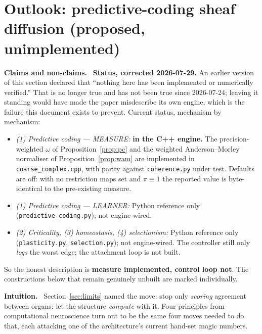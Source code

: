 \documentclass[11pt]{article}
\theoremstyle{definition}
\theoremstyle{plain}
\theoremstyle{remark}
\newcommand{\Intu}{\noindent\textbf{\color{intuitioncol}Intuition.}\ }
\newcommand{\Hon}{\noindent\textbf{\color{honestycol}Claims and non-claims.}\ }
\begin{document}
\section{Outlook: predictive-coding sheaf diffusion (proposed, unimplemented)}\label{sec:outlook}

\begin{hon}\Hon
\textbf{Status, corrected 2026-07-29.} An earlier version of this section declared
that ``nothing here has been implemented or numerically verified.'' That is no longer
true and has not been true since 2026-07-24; leaving it standing would have made the
paper misdescribe its own engine, which is the failure this document exists to
prevent. Current status, mechanism by mechanism:
\begin{itemize}[nosep]
\item \emph{(1) Predictive coding --- MEASURE:} \textbf{in the C++ engine.} The
  precision-weighted $\omega$ of Proposition~\ref{prop:pc} and the weighted
  Anderson--Morley normaliser of Proposition~\ref{prop:wam} are implemented in
  \texttt{coarse\_complex.cpp}, with parity against \texttt{coherence.py} under test.
  Defaults are off: with no restriction maps set and $\pi\equiv1$ the reported value
  is byte-identical to the pre-existing measure.
\item \emph{(1) Predictive coding --- LEARNER:} Python reference only
  (\texttt{predictive\_coding.py}); not engine-wired.
\item \emph{(2) Criticality, (3) homeostasis, (4) selectionism:} Python reference only
  (\texttt{plasticity.py}, \texttt{selection.py}); not engine-wired. The controller
  still only \emph{logs} the worst edge; the attachment loop is not built.
\end{itemize}
So the honest description is \textbf{measure implemented, control loop not}. The
constructions below that remain genuinely unbuilt are marked individually.
\end{hon}

\begin{intu}\Intu
Section~\ref{sec:limits} named the move: stop only \emph{scoring} agreement between
organs: let the structure \emph{compute} with it. Four principles from computational
neuroscience turn out to be the same four moves needed to do that, each attacking one
of the architecture's current hand-set magic numbers.
\end{intu}
\end{document}
